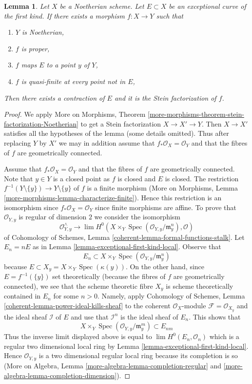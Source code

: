 \documentclass{stacks-project}
\theoremstyle{plain}
\newtheorem{lemma}[subsection]{Lemma}
\theoremstyle{definition}
\theoremstyle{remark}
\numberwithin{equation}{subsection}
\def\lim{\mathop{\mathrm{lim}}\nolimits}
\def\Spec{\mathop{\mathrm{Spec}}}
\begin{document}
\begin{lemma}
\label{lemma-contraction}
Let $X$ be a Noetherian scheme. Let $E \subset X$ be an
exceptional curve of the first kind. If there exists a morphism
$f : X \to Y$ such that
\begin{enumerate}
\item $Y$ is Noetherian,
\item $f$ is proper,
\item $f$ maps $E$ to a point $y$ of $Y$,
\item $f$ is quasi-finite at every point not in $E$,
\end{enumerate}
Then there exists a contraction of $E$ and it is the Stein
factorization of $f$.
\end{lemma}

\begin{proof}
We apply More on Morphisms, Theorem
\ref{more-morphisms-theorem-stein-factorization-Noetherian}
to get a Stein factorization $X \to X' \to Y$.
Then $X \to X'$ satisfies all the hypotheses of
the lemma (some details omitted).
Thus after replacing $Y$ by $X'$ we may in addition
assume that $f_*\mathcal{O}_X = \mathcal{O}_Y$ and
that the fibres of $f$ are geometrically connected.

\medskip\noindent
Assume that $f_*\mathcal{O}_X = \mathcal{O}_Y$ and
that the fibres of $f$ are geometrically connected.
Note that $y \in Y$ is a closed point as $f$ is closed and $E$ is closed.
The restriction $f^{-1}(Y \setminus \{y\}) \to Y \setminus \{y\}$
of $f$ is a finite morphism
(More on Morphisms, Lemma \ref{more-morphisms-lemma-characterize-finite}).
Hence this restriction is an isomorphism since
$f_*\mathcal{O}_X = \mathcal{O}_Y$ since finite morphisms are affine.
To prove that $\mathcal{O}_{Y, y}$ is regular of dimension
$2$ we consider the isomorphism
$$
\mathcal{O}_{Y, y}^\wedge \longrightarrow
\lim H^0(X \times_Y \Spec(\mathcal{O}_{Y, y}/\mathfrak m_y^n), \mathcal{O})
$$
of Cohomology of Schemes, Lemma \ref{coherent-lemma-formal-functions-stalk}.
Let $E_n = nE$ as in Lemma \ref{lemma-exceptional-first-kind-local}.
Observe that
$$
E_n \subset X \times_Y \Spec(\mathcal{O}_{Y, y}/\mathfrak m_y^n)
$$
because $E \subset X_y = X \times_Y \Spec(\kappa(y))$.
On the other hand, since $E = f^{-1}(\{y\})$ set theoretically
(because the fibres of $f$ are geometrically connected), we see that
the scheme theoretic fibre $X_y$ is scheme theoretically contained in
$E_n$ for some $n > 0$. Namely, apply
Cohomology of Schemes, Lemma \ref{coherent-lemma-power-ideal-kills-sheaf}
to the coherent $\mathcal{O}_X$-module $\mathcal{F} = \mathcal{O}_{X_y}$
and the ideal sheaf $\mathcal{I}$ of $E$ and use that
$\mathcal{I}^n$ is the ideal sheaf of $E_n$. This shows that
$$
X \times_Y \Spec(\mathcal{O}_{Y, y}/\mathfrak m_y^m) \subset E_{nm}
$$
Thus the inverse limit displayed above is equal to
$\lim H^0(E_n, \mathcal{O}_n)$
which is a regular two dimensional local ring by
Lemma \ref{lemma-exceptional-first-kind-local}.
Hence $\mathcal{O}_{Y, y}$ is a two dimensional regular local
ring because its completion is so
(More on Algebra, Lemma \ref{more-algebra-lemma-completion-regular} and
\ref{more-algebra-lemma-completion-dimension}).


\end{proof}
\end{document}
